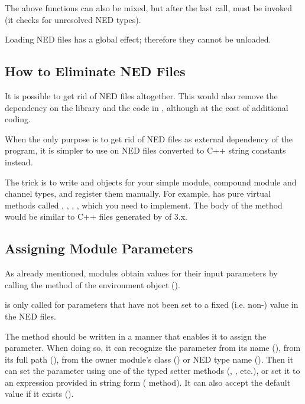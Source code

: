 The above functions can also be mixed, but after the last call,
 must be invoked (it checks for unresolved
NED types).

Loading NED files has a global effect; therefore they cannot be unloaded.


\subsection{How to Eliminate NED Files}
\label{sec:embedding:eliminating-ned-files}

It is possible to get rid of NED files altogether. This would also
remove the dependency on the  library and the code in
, although at the cost of additional coding.

\begin{note}
When the only purpose is to get rid of NED files as external dependency
of the program, it is simpler to use  on NED files
converted to C++ string constants instead.
\end{note}

The trick is to write  and  objects
for your simple module, compound module and channel types, and register them
manually. For example,  has pure virtual methods called
, ,
, , which you
need to implement. The body of the  method would
be similar to C++ files generated by  of {\opp} 3.x.


\subsection{Assigning Module Parameters}
\label{sec:embedding:assigning-module-parameters}

As already mentioned, modules obtain values for their input parameters
by calling the  method of the environment object
().

\begin{note}
 is only called for parameters that have not
been set to a fixed (i.e. non-) value in the NED files.
\end{note}

The  method should be written in a manner that enables it to assign
the parameter. When doing so, it can recognize the parameter from its name
(), from its full path (),
from the owner module's class ()
or NED type name ().
Then it can set the parameter using one of the typed setter methods
(, , etc.), or set it
to an expression provided in string form ( method).
It can also accept the default value if it exists ().

